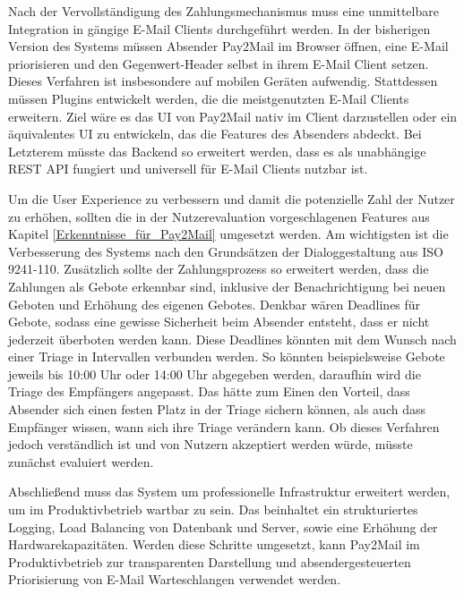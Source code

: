 Nach der Vervollständigung des Zahlungsmechanismus muss eine unmittelbare Integration in gängige E-Mail Clients durchgeführt werden. In der bisherigen Version des Systems müssen Absender Pay2Mail im Browser öffnen, eine E-Mail priorisieren und den Gegenwert-Header selbst in ihrem E-Mail Client setzen. Dieses Verfahren ist insbesondere auf mobilen Geräten aufwendig. Stattdessen müssen Plugins entwickelt werden, die die meistgenutzten E-Mail Clients erweitern. Ziel wäre es das UI von Pay2Mail nativ im Client darzustellen oder ein äquivalentes UI zu entwickeln, das die Features des Absenders abdeckt. Bei Letzterem müsste das Backend so erweitert werden, dass es als unabhängige REST API fungiert und universell für E-Mail Clients nutzbar ist. 

Um die User Experience zu verbessern und damit die potenzielle Zahl der Nutzer zu erhöhen, sollten die in der Nutzerevaluation vorgeschlagenen Features aus Kapitel \ref{Erkenntnisse_für_Pay2Mail} umgesetzt werden. Am wichtigsten ist die Verbesserung des Systems nach den Grundsätzen der Dialoggestaltung aus ISO 9241-110. Zusätzlich sollte der Zahlungsprozess so erweitert werden, dass die Zahlungen als Gebote erkennbar sind, inklusive der Benachrichtigung bei neuen Geboten und Erhöhung des eigenen Gebotes. Denkbar wären Deadlines für Gebote, sodass eine gewisse Sicherheit beim Absender entsteht, dass er nicht jederzeit überboten werden kann. Diese Deadlines könnten mit dem Wunsch nach einer Triage in Intervallen verbunden werden. So könnten beispielsweise Gebote jeweils bis 10:00 Uhr oder 14:00 Uhr abgegeben werden, daraufhin wird die Triage des Empfängers angepasst. Das hätte zum Einen den Vorteil, dass Absender sich einen festen Platz in der Triage sichern können, als auch dass Empfänger wissen, wann sich ihre Triage verändern kann. Ob dieses Verfahren jedoch verständlich ist und von Nutzern akzeptiert werden würde, müsste zunächst evaluiert werden.

Abschließend muss das System um professionelle Infrastruktur erweitert werden, um im Produktivbetrieb wartbar zu sein. Das beinhaltet ein strukturiertes Logging, Load Balancing von Datenbank und Server, sowie eine Erhöhung der Hardwarekapazitäten. Werden diese Schritte umgesetzt, kann Pay2Mail im Produktivbetrieb zur transparenten Darstellung und absendergesteuerten Priorisierung von E-Mail Warteschlangen verwendet werden.

